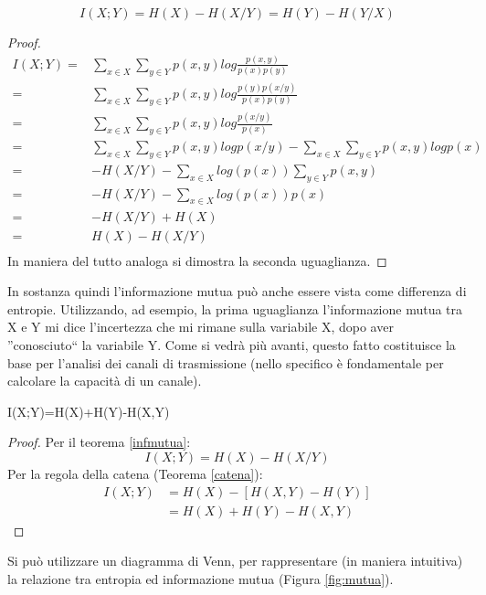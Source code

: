 \begin{teorema}
\[
 I(X;Y)=H(X)-H(X/Y)=H(Y)-H(Y/X)
\]
\begin{proof}
\[\begin{split}
 I(X;Y)=&\sum_{x \in X} \sum_{y \in Y} p(x,y) log \frac{p(x,y)}{p(x)p(y)} \\
   =&\sum_{x \in X} \sum_{y \in Y} p(x,y) log \frac{p(y)p(x/y)}{p(x)p(y)} \\
   =&\sum_{x \in X} \sum_{y \in Y} p(x,y) log \frac{p(x/y)}{p(x)} \\
   =&\sum_{x \in X} \sum_{y \in Y} p(x,y) log p(x/y)-\sum_{x \in X} \sum_{y \in Y} p(x,y) log p(x) \\
   =&-H(X/Y)-\sum_{x \in X} log (p(x)) \sum_{y \in Y} p(x,y)\\
   =&-H(X/Y)-\sum_{x \in X} log (p(x)) p(x)\\
   =&-H(X/Y)+H(X)\\
   =&H(X)-H(X/Y)\\
 \end{split}
\]
In maniera del tutto analoga si dimostra la seconda uguaglianza.
\end{proof}
\label{infmutua}
\end{teorema}

In sostanza quindi l'informazione mutua può anche essere vista come differenza di entropie. Utilizzando, ad esempio, la prima 
uguaglianza l'informazione mutua tra X e Y mi dice l'incertezza che mi rimane sulla variabile X, dopo aver ''conosciuto`` la variabile 
Y. Come si vedrà più avanti, questo fatto costituisce la base per l'analisi dei canali di trasmissione (nello specifico è fondamentale 
per calcolare la capacità di un canale).

\begin{osservazione}
 I(X;Y)=H(X)+H(Y)-H(X,Y)
 \begin{proof}
  Per il teorema \ref{infmutua}:
  \[
  I(X;Y)=H(X)-H(X/Y)
  \]
  Per la regola della catena (Teorema \ref{catena}):
  \[\begin{split}
  I(X;Y)&=H(X)-[H(X,Y)-H(Y)] \\
        &=H(X)+H(Y)-H(X,Y)
    \end{split}
  \]
 \end{proof}
\end{osservazione}

Si può utilizzare un diagramma di Venn, per rappresentare (in maniera intuitiva) la relazione tra entropia ed informazione mutua (Figura \ref{fig:mutua}).

